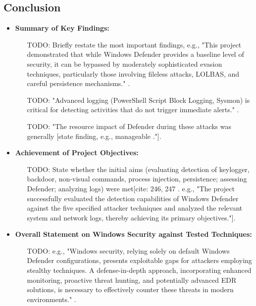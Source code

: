 \documentclass[11pt]{article}
\begin{document}
	\subsection{Conclusion}
	\begin{itemize}
		\item \textbf{Summary of Key Findings:}
		\begin{itemize}
			\item [TODO: Briefly restate the most important findings, e.g., "This project demonstrated that while Windows Defender provides a baseline level of security, it can be bypassed by moderately sophisticated evasion techniques, particularly those involving fileless attacks, LOLBAS, and careful persistence mechanisms."].
			\item [TODO: "Advanced logging (PowerShell Script Block Logging, Sysmon) is critical for detecting activities that do not trigger immediate alerts."].
			\item [TODO: "The resource impact of Defender during these attacks was generally [state finding, e.g., manageable]."].
		\end{itemize}
		\item \textbf{Achievement of Project Objectives:}
		\begin{itemize}
			\item [TODO: State whether the initial aims (evaluating detection of keylogger, backdoor, non-visual commands, process injection, persistence; assessing Defender; analyzing logs) were met[cite: 246, 247]. e.g., "The project successfully evaluated the detection capabilities of Windows Defender against the five specified attacker techniques and analyzed the relevant system and network logs, thereby achieving its primary objectives."].
		\end{itemize}
		\item \textbf{Overall Statement on Windows Security against Tested Techniques:}
		\begin{itemize}
			\item [TODO: e.g., "Windows security, relying solely on default Windows Defender configurations, presents exploitable gaps for attackers employing stealthy techniques. A defense-in-depth approach, incorporating enhanced monitoring, proactive threat hunting, and potentially advanced EDR solutions, is necessary to effectively counter these threats in modern environments."].
		\end{itemize}
	\end{itemize}
	
\end{document}
